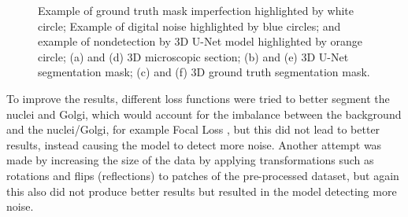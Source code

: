 \begin{figure}[!htb]
\hfil   
{}\hfil
{}
\caption{Example of ground truth mask imperfection highlighted by white circle; Example of digital noise highlighted by blue circles; and example of nondetection by 3D U-Net model highlighted by orange circle; (a) and (d) 3D microscopic section; (b) and (e) 3D U-Net segmentation mask; (c) and (f) 3D ground truth segmentation mask.}
\label{fig:errors-unet}



\end{figure}

To improve the results, different loss functions were tried to better segment the nuclei and Golgi, which would account for the imbalance between the background and the nuclei/Golgi, for example Focal Loss \cite{focal_loss}, but this did not lead to better results, instead causing the model to detect more noise. Another attempt was made by increasing the size of the data by applying transformations such as rotations and flips (reflections) to patches of the pre-processed dataset, but again this also did not produce better results but resulted in the model detecting more noise.

